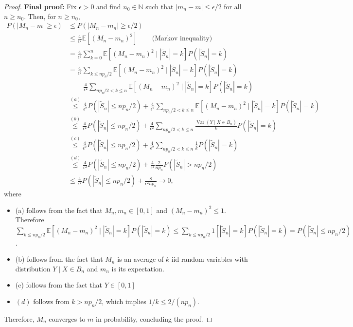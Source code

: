 \documentclass[a4paper,11pt]{article}
\begin{document}
\begin{proof}
\textbf{Final proof: }
Fix \(\epsilon>0\) and find \(n_0\in\mathbb N\) such that
\(|m_n-m|\leq \epsilon/2\) for all \(n\geq n_0\). Then, for \(n\geq n_0\),
\begin{align*}
P(|M_n-m|\geq \epsilon)
&\leq P(|M_n-m_n|\geq \epsilon/2)\\
&\leq \frac{4}{\epsilon^2}\mathbb{E}[(M_n-m_n)^2] \qquad \,\text{(Markov inequality)}\\
&=\frac{4}{\epsilon^2}\sum_{k=0}^n
\mathbb{E}[(M_n-m_n)^2\mid |\tilde{S}_n|=k]P(|\tilde{S}_n|=k)\\
&=\frac{4}{\epsilon^2}\sum_{k\leq np_n/2}
\mathbb{E}[(M_n-m_n)^2\mid |\tilde{S}_n|=k]P(|\tilde{S}_n|=k)\\
&\quad+
\frac{4}{\epsilon^2}\sum_{np_n/2<k\leq n}
\mathbb{E}[(M_n-m_n)^2\mid |\tilde{S}_n|=k]P(|\tilde{S}_n|=k)\\
&\overset{(a)}{\leq}
\frac{4}{\epsilon^2}P(|\tilde{S}_n|\leq np_n/2)
+
\frac{4}{\epsilon^2}\sum_{np_n/2<k\leq n}
\mathbb{E}[(M_n-m_n)^2\mid |\tilde{S}_n|=k]P(|\tilde{S}_n|=k)\\
&\overset{(b)}{\leq}
\frac{4}{\epsilon^2}P(|\tilde{S}_n|\leq np_n/2)
+
\frac{4}{\epsilon^2}\sum_{np_n/2<k\leq n}
\frac{\operatorname{Var}(Y\mid X\in B_n)}{k}P(|\tilde{S}_n|=k)\\
&\overset{(c)}{\leq}
\frac{4}{\epsilon^2}P(|\tilde{S}_n|\leq np_n/2)
+
\frac{4}{\epsilon^2}\sum_{np_n/2<k\leq n}
\frac{1}{k}P(|\tilde{S}_n|=k)\\
&\overset{(d)}{\leq}
\frac{4}{\epsilon^2}P(|\tilde{S}_n|\leq np_n/2)
+
\frac{4}{\epsilon^2}\frac{2}{np_n}
P(|\tilde{S}_n|>np_n/2)\\
&\leq
\frac{4}{\epsilon^2}P(|\tilde{S}_n|\leq np_n/2)
+
\frac{8}{\epsilon^2np_n}
\to 0,
\end{align*}
where
\begin{itemize}
    \item (a) follows from the fact that  \(M_n,m_n\in[0,1]\) and \((M_n-m_n)^2\leq 1\). Therefore $\sum_{k\leq np_n/2}
\mathbb{E}[(M_n-m_n)^2\mid |\tilde{S}_n|=k]P(|\tilde{S}_n|=k)\leq \sum_{k\leq np_n/2}
1[|\tilde{S}_n|=k ]P(|\tilde{S}_n|=k) = P(|\tilde{S}_n|\leq np_n/2)$.
    \item (b) follows from the fact that \(M_n\) is an average of
     \(k\) iid random variables with distribution \(Y\mid X\in B_n\) and $m_n$ is its expectation.
    \item (c) follows from the fact that $Y\in[0,1]$
    \item \((d)\) follows from \(k>np_n/2\), which implies \(1/k\leq 2/(np_n)\). 
\end{itemize}
Therefore, $M_n$ converges to $m$ in probability, concluding the proof.
\end{proof}
\end{document}
